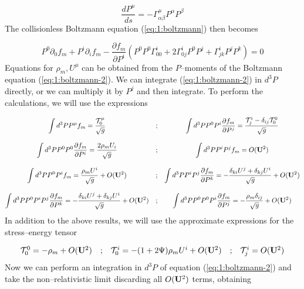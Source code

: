 \begin{equation}
\label{eq:1:geodesic}
\frac{dP^\mu}{ds} = -\Gamma^\mu_{\alpha\beta}P^\alpha P^\beta
\end{equation}
%
The collisionless Boltzmann equation (\ref{eq:1:boltzmann}) then becomes

\begin{equation}
\label{eq:1:boltzmann-2}
P^0\partial_0 f_m + P^i\partial_i f_m - \frac{\partial f_m}{\partial P^i}\left(P^0P^0\Gamma_{00}^i + 2\Gamma_{0j}^iP^0P^j + \Gamma_{jk}^i P^jP^k \right) = 0
\end{equation}
%
Equations for $\rho_m,U^\mu$ can be obtained from the $P$--moments of the Boltzmann equation (\ref{eq:1:boltzmann-2}). We can integrate (\ref{eq:1:boltzmann-2}) in $d^3P$ directly, or we can multiply it by $P^j$ and then integrate. To perform the calculations, we will use the expressions

\begin{equation*}
\label{eq:1:boltzmann-mom}
\begin{matrix}
\displaystyle \int d^3P P^\mu f_m = \frac{\mathcal{T}^\mu_0}{\sqrt{g}} & ; & \displaystyle \int d^3P P^0 P^i \frac{\partial f_m}{\partial P^j} = \frac{\mathcal{T}^i_j-\delta_{ij}\mathcal{T}^0_0}{\sqrt{g}} \\ \\
\displaystyle \int d^3P P^0P^0 \frac{\partial f_m}{\partial P^i} = \frac{2\rho_m U_i}{\sqrt{g}} & ; & \displaystyle \int d^3P P^iP^j f_m =  O(\mathbf{U}^2) \\ \\ 
\displaystyle \int d^3P P^0P^i f_m = \frac{\rho_mU^i}{\sqrt{g}} + O(\mathbf{U}^2) & ; & \displaystyle \int d^3P P^iP^j \frac{\partial f_m}{\partial P^k} = -\frac{\delta_{ki}U^j + \delta_{kj}U^i}{\sqrt{g}} + O(\mathbf{U}^2)  \\ \\
\displaystyle \int d^3P P^0P^iP^j \frac{\partial f_m}{\partial P^k} = -\frac{\delta_{ki}U^j + \delta_{kj}U^i}{\sqrt{g}} + O(\mathbf{U}^2) & ; & \displaystyle \int d^3P P^0P^0P^i \frac{\partial f_m}{\partial P^j} = -\frac{\rho_m\delta_{ij}}{\sqrt{g}} + O(\mathbf{U}^2)
\end{matrix}
\end{equation*}
%
In addition to the above results, we will use the approximate expressions for the stress--energy tensor 

\begin{equation}
\label{eq:1:stress-energy-nr}
\begin{matrix}
\mathcal{T}^0_0 = -\rho_m + O(\mathbf{U}^2) & ; & \mathcal{T}^i_0 = -(1+2\Psi)\rho_m U^i + O(\mathbf{U}^2)  & ; & \mathcal{T}^i_j = O(\mathbf{U}^2)
\end{matrix}
\end{equation}
%
Now we can perform an integration in $d^3P$ of equation (\ref{eq:1:boltzmann-2}) and take the non--relativistic limit discarding all $O(\mathbf{U}^2)$ terms, obtaining

